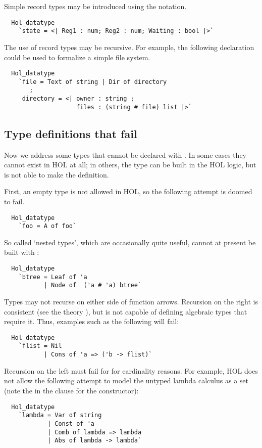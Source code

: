 %
Simple record types may be introduced using the  notation.
%
\begin{hol}
\begin{verbatim}
  Hol_datatype
    `state = <| Reg1 : num; Reg2 : num; Waiting : bool |>`
\end{verbatim}
\end{hol}
%
The use of record types may be recursive. For example, the following
declaration could be used to formalize a simple file system.
%
\begin{hol}
\begin{verbatim}
  Hol_datatype
    `file = Text of string | Dir of directory
       ;
     directory = <| owner : string ;
                    files : (string # file) list |>`
\end{verbatim}
\end{hol}

\subsection{Type definitions that fail}

 Now we address some types that cannot be declared with .
In some cases they cannot exist in HOL at all; in others, the type
can be built in the HOL logic, but  is not able to make
the definition.

First, an empty type is not allowed in HOL, so the following attempt
is doomed to fail.
%
\begin{hol}
\begin{verbatim}
  Hol_datatype
    `foo = A of foo`
\end{verbatim}
\end{hol}
%
So called `nested types', which are occasionally quite useful, cannot
at present be built with :
%
\begin{hol}
\begin{verbatim}
  Hol_datatype
    `btree = Leaf of 'a
           | Node of  ('a # 'a) btree`
\end{verbatim}
\end{hol}
%
Types may not recurse on either side of function arrows.  Recursion on
the right is consistent (see the theory ), but
 is not capable of defining algebraic types that
require it.  Thus, examples such as the following will fail:
%
\begin{hol}
\begin{verbatim}
  Hol_datatype
    `flist = Nil
           | Cons of 'a => ('b -> flist)`
\end{verbatim}
\end{hol}
%
Recursion on the left must fail for for cardinality reasons. For
example, HOL does not allow the following attempt to model the untyped
lambda calculus as a set (note the \holtxt{->} in the clause for the
 constructor):
%
\begin{hol}
\begin{verbatim}
  Hol_datatype
    `lambda = Var of string
            | Const of 'a
            | Comb of lambda => lambda
            | Abs of lambda -> lambda`
\end{verbatim}
\end{hol}

